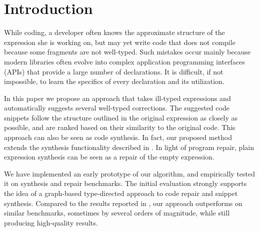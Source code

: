 \section{Introduction}
\label{sec:intro}
While coding, a developer often knows the approximate structure of the expression she is working on, but may yet write code that does not compile because some fragments are not well-typed. Such mistakes occur mainly because modern libraries often evolve into complex application programming interfaces (APIs) that provide a large number of declarations. It is difficult, if not impossible, to learn the specifics of every declaration and its utilization.

In this paper we propose an approach that takes ill-typed expressions and automatically suggests several well-typed corrections. The suggested code snippets follow the structure outlined in the original expression as closely as possible, and are ranked based on their similarity to the original code. This approach can also be seen as code synthesis. In fact, our proposed method extends the synthesis functionality described in \cite{MandelinetALL2005Jungloid, GveroETAL13CompleteCompletionTypesWeights, PerelmanGBG12}. In light of program repair, plain expression synthesis can be seen as a repair of the empty expression.

We have implemented an early prototype of our algorithm, and empirically tested it on synthesis and repair benchmarks. The initial evaluation strongly supports the idea of a graph-based type-directed approach to code repair and snippet synthesis. Compared to the results reported in \cite{GveroETAL13CompleteCompletionTypesWeights}, our approach outperforms on similar benchmarks, sometimes by several orders of magnitude, while still producing high-quality results.
